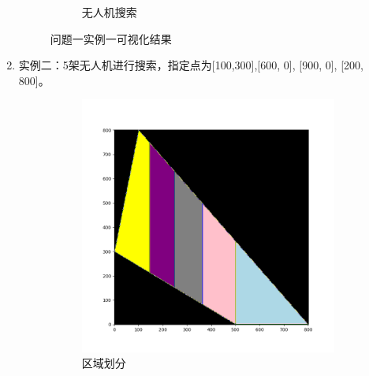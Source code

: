 \documentclass[bwprint]{gmcmthesis}
\numberwithin{figure}{section}
\begin{document}
\begin{enumerate}
\begin{figure}[h]
\begin{subfigure}{0.5\textwidth}
			\caption{无人机搜索}
		\end{subfigure}
		\caption{问题一实例一可视化结果}
	\end{figure}
	\vspace{1cm} %
	\item 实例二：5架无人机进行搜索，指定点为[100,300],[600, 0], [900, 0], [200, 800]。
		\begin{figure}[h]
		\centering
		\begin{subfigure}{0.5\textwidth}  %
			\centering
			\includegraphics[width=\textwidth]{../assets/img/3.png}  %
			\caption{区域划分}
		\end{subfigure}\hfill
		\begin{subfigure}{0.5\textwidth}  %
			\centering

\end{subfigure}
\end{figure}
\end{enumerate}
\end{document}
